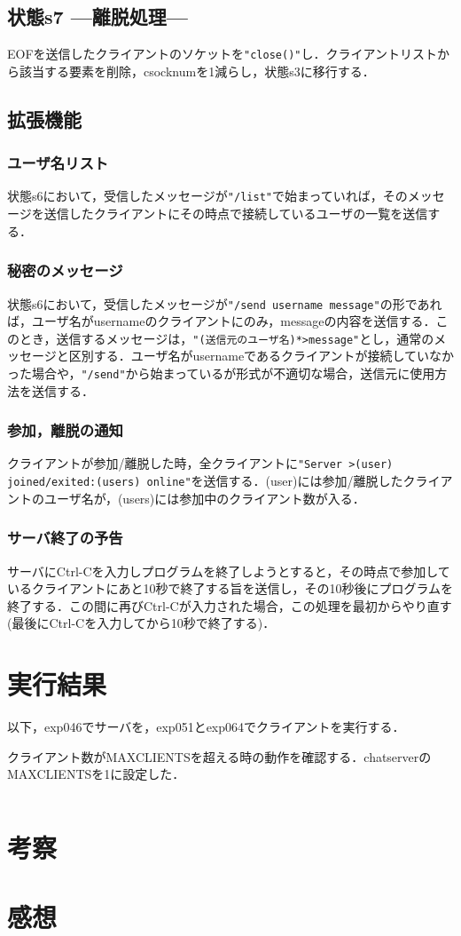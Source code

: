 \documentclass[a4j,10pt,titlepage]{jsarticle}
\begin{document}
\subsection{状態s7 ---離脱処理---}
EOFを送信したクライアントのソケットを\verb|"close()"|し．クライアントリストから該当する要素を削除，csocknumを1減らし，状態s3に移行する．

\subsection{拡張機能}\label{sec:extsrv}
\subsubsection{ユーザ名リスト}
状態s6において，受信したメッセージが\verb|"/list"|で始まっていれば，そのメッセージを送信したクライアントにその時点で接続しているユーザの一覧を送信する．

\subsubsection{秘密のメッセージ}
状態s6において，受信したメッセージが\verb|"/send username message"|の形であれば，ユーザ名がusernameのクライアントにのみ，messageの内容を送信する．このとき，送信するメッセージは，\verb|"(送信元のユーザ名)*>message"|とし，通常のメッセージと区別する．ユーザ名がusernameであるクライアントが接続していなかった場合や，\verb|"/send"|から始まっているが形式が不適切な場合，送信元に使用方法を送信する．

\subsubsection{参加，離脱の通知}
クライアントが参加/離脱した時，全クライアントに\verb|"Server >(user) joined/exited:(users) online"|を送信する．(user)には参加/離脱したクライアントのユーザ名が，(users)には参加中のクライアント数が入る．

\subsubsection{サーバ終了の予告}
サーバにCtrl-Cを入力しプログラムを終了しようとすると，その時点で参加しているクライアントにあと10秒で終了する旨を送信し，その10秒後にプログラムを終了する．この間に再びCtrl-Cが入力された場合，この処理を最初からやり直す(最後にCtrl-Cを入力してから10秒で終了する)．

\section{実行結果}
以下，exp046でサーバを，exp051とexp064でクライアントを実行する．

クライアント数がMAXCLIENTSを超える時の動作を確認する．chatserverのMAXCLIENTSを1に設定した．
\begin{verbatim}

\end{verbatim}

\section{考察}

\section{感想}
\end{document}
